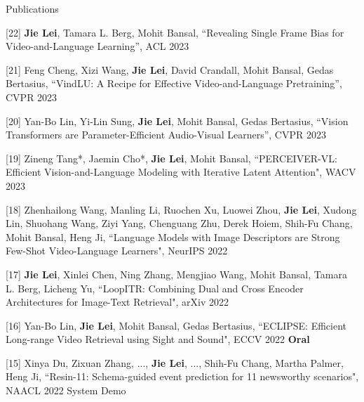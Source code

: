 \documentclass{resume} %
\begin{document}
\begin{rSection}{Publications}
    \item {[22]
    \textbf{Jie Lei}, Tamara L. Berg, Mohit Bansal,
    ``Revealing Single Frame Bias for Video-and-Language Learning'',
     ACL 2023
    }
    \item {[21]
    Feng Cheng, Xizi Wang, \textbf{Jie Lei}, David Crandall, Mohit Bansal, Gedas Bertasius,
    ``VindLU: A Recipe for Effective Video-and-Language Pretraining'',
     CVPR 2023
    }
    \item {[20]
    Yan-Bo Lin, Yi-Lin Sung, \textbf{Jie Lei}, Mohit Bansal, Gedas Bertasius,
    ``Vision Transformers are Parameter-Efficient Audio-Visual Learners'',
     CVPR 2023
    }
    \item {[19]
    Zineng Tang*, Jaemin Cho*, \textbf{Jie Lei}, Mohit Bansal,
    ``PERCEIVER-VL: Efficient Vision-and-Language Modeling with Iterative Latent Attention",
    WACV 2023
    }
    \item {[18]
    Zhenhailong Wang, Manling Li, Ruochen Xu, Luowei Zhou,  \textbf{Jie Lei}, Xudong Lin, Shuohang Wang, Ziyi Yang, Chenguang Zhu, Derek Hoiem, Shih-Fu Chang, Mohit Bansal, Heng Ji,
    ``Language Models with Image Descriptors are Strong Few-Shot Video-Language Learners",
     NeurIPS 2022
    }
    \item {[17]
    \textbf{Jie Lei}, Xinlei Chen, Ning Zhang, Mengjiao Wang, Mohit Bansal, Tamara L. Berg, Licheng Yu,
    ``LoopITR: Combining Dual and Cross Encoder Architectures for Image-Text Retrieval",
    arXiv 2022
    }
    \item {[16]
    Yan-Bo Lin, \textbf{Jie Lei}, Mohit Bansal, Gedas Bertasius,
    ``ECLIPSE: Efficient Long-range Video Retrieval using Sight and Sound",
     ECCV 2022 {\color{bittersweet}\textbf{Oral}}
    }

    \item {[15]
    Xinya Du, Zixuan Zhang, ..., \textbf{Jie Lei}, ..., Shih-Fu Chang, Martha Palmer, Heng Ji,
    ``Resin-11: Schema-guided event prediction for 11 newsworthy scenarios",
     NAACL 2022 System Demo
    }


\end{rSection}
\end{document}
